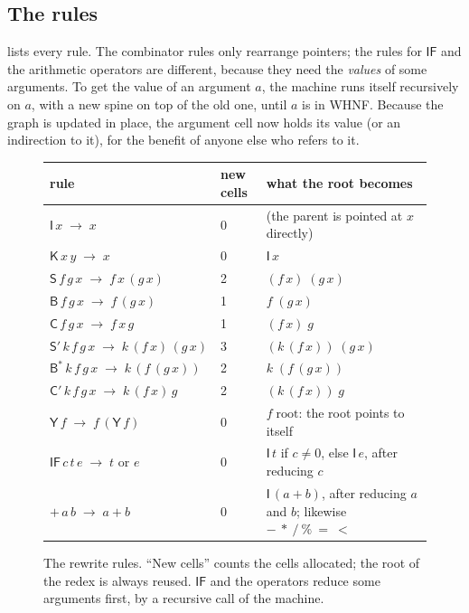 \documentclass[11pt,a4paper]{article}
\newcommand{\cmb}[1]{\textsf{#1}}
\newcommand{\I}{\cmb{I}}
\newcommand{\K}{\cmb{K}}
\newcommand{\Sc}{\cmb{S}}
\newcommand{\B}{\cmb{B}}
\newcommand{\C}{\cmb{C}}
\newcommand{\Sp}{\cmb{S}'}
\newcommand{\Bs}{\cmb{B}^{*}}
\newcommand{\Cp}{\cmb{C}'}
\newcommand{\Y}{\cmb{Y}}
\newcommand{\IF}{\cmb{IF}}
\newcommand{\red}{\;\to\;}
\theoremstyle{definition}
\theoremstyle{plain}
\begin{document}
\subsection{The rules}\label{sec:rules}

 lists every rule. The combinator rules only rearrange
pointers; the rules for $\IF$ and the arithmetic operators are different,
because they need the \emph{values} of some arguments. To get the value of
an argument $a$, the machine runs itself recursively on $a$, with a new spine
on top of the old one, until $a$ is in WHNF. Because the graph is updated in
place, the argument cell now holds its value (or an indirection to it), for
the benefit of anyone else who refers to it.

\begin{figure}[t]
\centering
\small
\renewcommand{\arraystretch}{1.2}
\begin{tabular}{@{}l l l@{}}
\toprule
rule & new cells & what the root becomes\\
\midrule
$\I\,x \red x$ & 0 & (the parent is pointed at $x$ directly)\\
$\K\,x\,y \red x$ & 0 & $\I\,x$\\
$\Sc\,f\,g\,x \red f\,x\,(g\,x)$ & 2 & $(f\,x)\;(g\,x)$\\
$\B\,f\,g\,x \red f\,(g\,x)$ & 1 & $f\;(g\,x)$\\
$\C\,f\,g\,x \red f\,x\,g$ & 1 & $(f\,x)\;g$\\
$\Sp\,k\,f\,g\,x \red k\,(f\,x)\,(g\,x)$ & 3 & $(k\,(f\,x))\;(g\,x)$\\
$\Bs\,k\,f\,g\,x \red k\,(f\,(g\,x))$ & 2 & $k\;(f\,(g\,x))$\\
$\Cp\,k\,f\,g\,x \red k\,(f\,x)\,g$ & 2 & $(k\,(f\,x))\;g$\\
$\Y\,f \red f\,(\Y\,f)$ & 0 & $f\;\text{root}$: the root points to itself\\
$\IF\,c\,t\,e \red t$ or $e$ & 0 & $\I\,t$ if $c \ne 0$, else $\I\,e$, after reducing $c$\\
${+}\,a\,b \red a+b$ & 0 & $\I\,(a+b)$, after reducing $a$ and $b$; likewise ${-}\ {*}\ {/}\ {\%}\ {=}\ {<}$\\
\bottomrule
\end{tabular}
\caption{The rewrite rules. ``New cells'' counts the cells allocated; the root
of the redex is always reused. $\IF$ and the operators reduce some
arguments first, by a recursive call of the machine.}
\label{fig:rules}
\end{figure}
\end{document}
